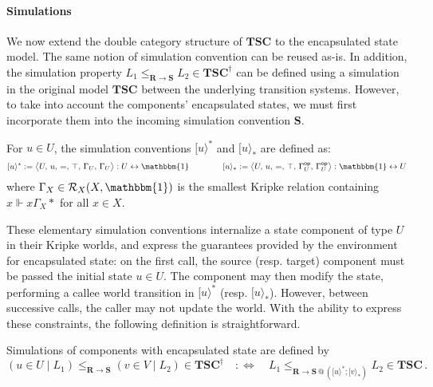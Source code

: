 \documentclass[acmsmall,screen,review,anonymous]{acmart}
\newcommand{\kw}[1]{\ensuremath{ \mathsf{#1} }}
\begin{document}
\paragraph{Simulations} %

We now extend the double category structure of $\mathbf{TSC}$
to the encapsulated state model.
The same notion of simulation convention can be reused as-is.
In addition,
the simulation property
$L_1 \le_{\mathbf{R} \rightarrow \mathbf{S}} L_2 \in \mathbf{TSC}^\dagger$
can be defined using a simulation
in the original model $\mathbf{TSC}$
between the underlying transition systems.
However,
to take into account the components' encapsulated states,
we must first incorporate them into
the incoming simulation convention $\mathbf{S}$.

\begin{definition}
For $u \in U$,
the simulation conventions
$[ u \rangle^*$ and
$[ u \rangle_*$ are defined as:
\[
  [ u \rangle^* :=
    \big\langle U,\, u,\, {=},\, \top,\, \Gamma_U,\, \Gamma_U \big\rangle
    : U \leftrightarrow \mathbbm{1}
  \qquad \qquad
  [ u \rangle_* :=
    \big\langle U,\, u,\, {=},\, \top,\, \Gamma_U^\kw{op},\, \Gamma_U^\kw{op} \big\rangle
    : \mathbbm{1} \leftrightarrow U
\]
where $\Gamma_X \in \mathcal{R}_X(X, \mathbbm{1})$
is the smallest Kripke relation containing $x \Vdash x \mathrel{\Gamma_X} *$ for all $x \in X$.
\end{definition}

These elementary simulation conventions
internalize a state component of type $U$ in their Kripke worlds,
and express the guarantees provided by the environment
for encapsulated state:
on the first call, the source (resp. target) component
must be passed the initial state $u \in U$.
The component may then modify the state,
performing a callee world transition
in $[ u \rangle^*$ (resp. $[ u \rangle_*$).
However,
between successive calls,
the caller may not update the world.
With the ability to express these constraints,
the following definition is straightforward.

\begin{definition} \label{def:ssim} %
Simulations of components with encapsulated state are defined by
\[
  (u \in U \mid L_1)
  \le_{\mathbf{R} \rightarrow \mathbf{S}}
  (v \in V \mid L_2)
  \in \mathbf{TSC}^\dagger
  \quad:\Leftrightarrow\quad
  L_1
  \le_{\mathbf{R} \rightarrow
       \mathbf{S} \mathbin@ ([ u \rangle^* \mathbin; [ v \rangle_*)}
  L_2
  \in
  \mathbf{TSC}
  \,.
\]
\end{definition}
\end{document}
